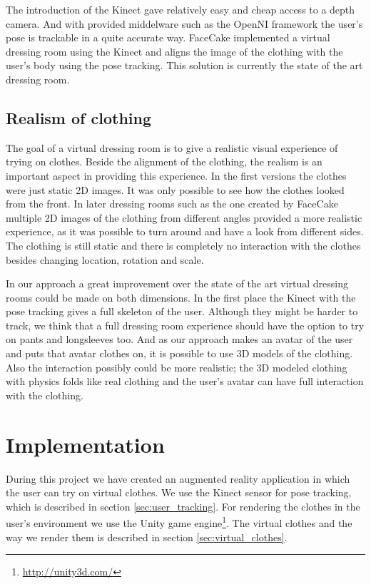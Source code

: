 \documentclass[a4paper]{article}
\begin{document}
The introduction of the Kinect gave relatively easy and cheap access to a depth camera. And with provided middelware such as the OpenNI framework the user's pose is trackable in a quite accurate way. FaceCake implemented a virtual dressing room using the Kinect and aligns the image of the clothing with the user's body using the pose tracking. This solution is currently the state of the art dressing room.


\subsection{Realism of clothing}

The goal of a virtual dressing room is to give a realistic visual experience of trying on clothes. Beside the alignment of the clothing, the realism is an important aspect in providing this experience. In the first versions the clothes were just static 2D images. It was only possible to see how the clothes looked from the front. In later dressing rooms such as the one created by FaceCake multiple 2D images of the clothing from different angles provided a more realistic experience, as it was possible to turn around and have a look from different sides. The clothing is still static and there is completely no interaction with the clothes besides changing location, rotation and scale.

In our approach a great improvement over the state of the art virtual dressing rooms could be made on both dimensions. In the first place the Kinect with the pose tracking gives a full skeleton of the user. Although they might be harder to track, we think that a full dressing room experience should have the option to try on pants and longsleeves too. And as our approach makes an avatar of the user and puts that avatar clothes on, it is possible to use 3D models of the clothing. Also the interaction possibly could be more realistic; the 3D modeled clothing with physics folds like real clothing and the user's avatar can have full interaction with the clothing.

\section{Implementation}
\label{sec:implementation}

During this project we have created an augmented reality application in which the user can try on virtual clothes. We use the Kinect sensor for pose tracking, which is described in section \ref{sec:user_tracking}. For rendering the clothes in the user's environment we use the Unity game engine\footnote{\url{http://unity3d.com/}}. The virtual clothes and the way we render them is described in section \ref{sec:virtual_clothes}.
\end{document}
